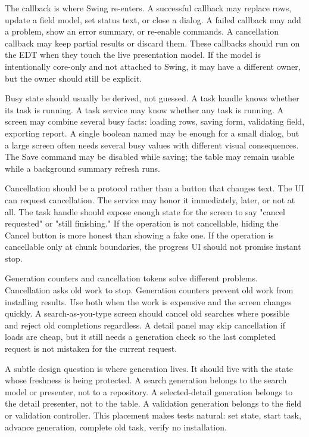 The callback is where Swing re-enters. A successful callback may replace rows, update a field model, set status text, or close a dialog. A failed callback may add a problem, show an error summary, or re-enable commands. A cancellation callback may keep partial results or discard them. These callbacks should run on the EDT when they touch the live presentation model. If the model is intentionally core-only and not attached to Swing, it may have a different owner, but the owner should still be explicit.

Busy state should usually be derived, not guessed. A task handle knows whether its task is running. A task service may know whether any task is running. A screen may combine several busy facts: loading rows, saving form, validating field, exporting report. A single boolean named  may be enough for a small dialog, but a large screen often needs several busy values with different visual consequences. The Save command may be disabled while saving; the table may remain usable while a background summary refresh runs.

Cancellation should be a protocol rather than a button that changes text. The UI can request cancellation. The service may honor it immediately, later, or not at all. The task handle should expose enough state for the screen to say "cancel requested" or "still finishing." If the operation is not cancellable, hiding the Cancel button is more honest than showing a fake one. If the operation is cancellable only at chunk boundaries, the progress UI should not promise instant stop.

Generation counters and cancellation tokens solve different problems. Cancellation asks old work to stop. Generation counters prevent old work from installing results. Use both when the work is expensive and the screen changes quickly. A search-as-you-type screen should cancel old searches where possible and reject old completions regardless. A detail panel may skip cancellation if loads are cheap, but it still needs a generation check so the last completed request is not mistaken for the current request.

A subtle design question is where generation lives. It should live with the state whose freshness is being protected. A search generation belongs to the search model or presenter, not to a repository. A selected-detail generation belongs to the detail presenter, not to the table. A validation generation belongs to the field or validation controller. This placement makes tests natural: set state, start task, advance generation, complete old task, verify no installation.

